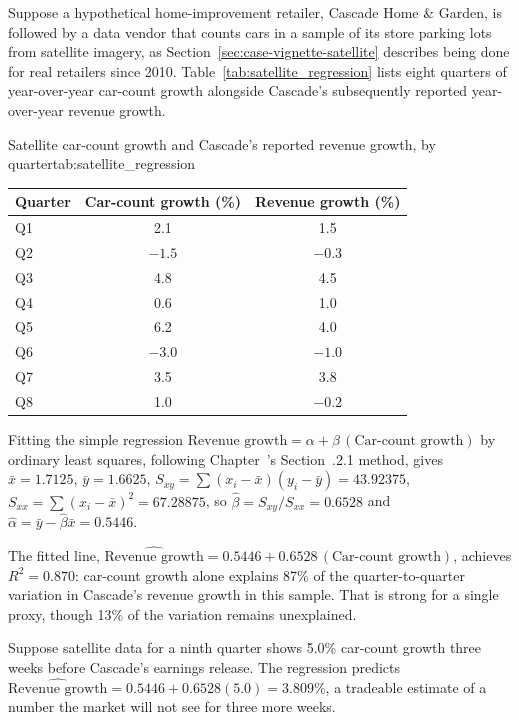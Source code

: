 \documentclass[../ai_in_finance]{subfiles}
\begin{document}
Suppose a hypothetical home-improvement retailer, Cascade Home \& Garden, is followed by a data vendor that counts cars in a sample of its store parking lots from satellite imagery, as Section~\ref{sec:case-vignette-satellite} describes being done for real retailers since 2010. Table~\ref{tab:satellite_regression} lists eight quarters of year-over-year car-count growth alongside Cascade's subsequently reported year-over-year revenue growth.

\begin{booktable}[htbp]{Satellite car-count growth and Cascade's reported revenue growth, by quarter}{tab:satellite_regression}
\begin{tabular}{lcc}
\toprule
Quarter & Car-count growth (\%) & Revenue growth (\%) \\
\midrule
Q1 & 2.1 & 1.5 \\
Q2 & $-1.5$ & $-0.3$ \\
Q3 & 4.8 & 4.5 \\
Q4 & 0.6 & 1.0 \\
Q5 & 6.2 & 4.0 \\
Q6 & $-3.0$ & $-1.0$ \\
Q7 & 3.5 & 3.8 \\
Q8 & 1.0 & $-0.2$ \\
\bottomrule
\end{tabular}
\end{booktable}

Fitting the simple regression $\text{Revenue growth} = \alpha + \beta\,(\text{Car-count growth})$ by ordinary least squares, following Chapter~'s Section~.2.1 method, gives $\bar x = 1.7125$, $\bar y = 1.6625$, $S_{xy} = \sum(x_i - \bar x)(y_i - \bar y) = 43.92375$, $S_{xx} = \sum(x_i-\bar x)^2 = 67.28875$, so $\hat\beta = S_{xy}/S_{xx} = 0.6528$ and $\hat\alpha = \bar y - \hat\beta \bar x = 0.5446$.

The fitted line, $\widehat{\text{Revenue growth}} = 0.5446 + 0.6528\,(\text{Car-count growth})$, achieves $R^2 = 0.870$: car-count growth alone explains 87\% of the quarter-to-quarter variation in Cascade's revenue growth in this sample. That is strong for a single proxy, though 13\% of the variation remains unexplained.

Suppose satellite data for a ninth quarter shows 5.0\% car-count growth three weeks before Cascade's earnings release. The regression predicts $\widehat{\text{Revenue growth}} = 0.5446 + 0.6528(5.0) = 3.809\%$, a tradeable estimate of a number the market will not see for three more weeks.
\end{document}
